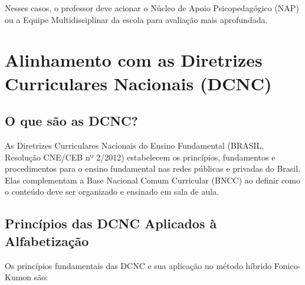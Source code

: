 Nesses casos, o professor deve acionar o Núcleo de Apoio Psicopedagógico
(NAP) ou a Equipe Multidisciplinar da escola para avaliação mais aprofundada.


\chapter{Alinhamento com as Diretrizes Curriculares Nacionais (DCNC)}

\section{O que são as DCNC?}

As Diretrizes Curriculares Nacionais do Ensino Fundamental
(BRASIL, Resolu\c{c}\~{a}o CNE/CEB nº 2/2012) estabelecem os
princ\'{i}pios, fundamentos e procedimentos para o ensino
fundamental nas redes p\'{u}blicas e privadas do Brasil.
Elas complementam a Base Nacional Comum Curricular (BNCC)
ao definir como o conte\'{u}do deve ser organizado e
ensinado em sala de aula.

\section{Princ\'{i}pios das DCNC Aplicados à Alfabetiza\c{c}\~{a}o}

Os princ\'{i}pios fundamentais das DCNC e sua aplica\c{c}\~{a}o
no m\'{e}todo h\'{i}brido Fonico-Kumon s\~{a}o:

